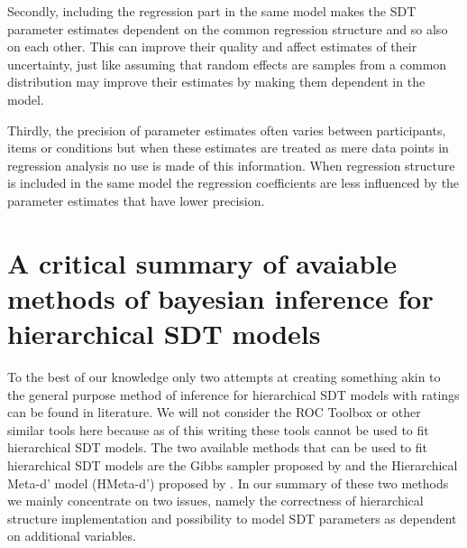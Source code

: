 \documentclass[oneside,a4paper]{article}
\begin{document}
Secondly, including the regression part in the same model makes the
SDT parameter estimates dependent on the common regression structure
and so also on each other. This can improve their quality and affect
estimates of their uncertainty, just like assuming that random effects
are samples from a common distribution may improve their estimates by
making them dependent in the model.

Thirdly, the precision of parameter estimates often varies between
participants, items or conditions but when these estimates are treated
as mere data points in regression analysis no use is made of this
information. When regression structure is included in the same model
the regression coefficients are less influenced by the parameter
estimates that have lower precision.

\section{A critical summary of avaiable methods of bayesian inference
  for hierarchical SDT models}

To the best of our knowledge only two attempts at creating something
akin to the general purpose method of inference for hierarchical SDT
models with ratings can be found in literature. We will not consider
the ROC Toolbox \cite{Koen2016} or other similar tools here because as
of this writing these tools cannot be used to fit hierarchical SDT
models. The two available methods that can be used to fit hierarchical
SDT models are the Gibbs sampler proposed by
 and the Hierarchical Meta-d' model
(HMeta-d') proposed by . In our summary of these two
methods we mainly concentrate on two issues, namely the correctness of
hierarchical structure implementation and possibility to model SDT
parameters as dependent on additional variables.
\end{document}
